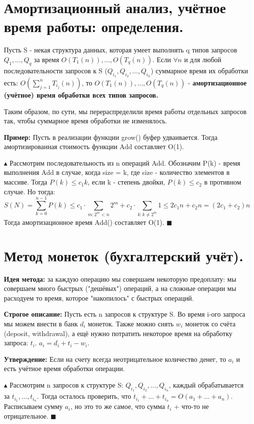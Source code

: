 \setcounter{section}{31}
\section{Амортизационный анализ, учётное время работы: определения.}
Пусть S - некая структура данных, которая умеет выполнять q типов запросов $Q_1, \dots, Q_q$ за время ${O}(T_1(n)), \dots, {O}(T_q(n))$. Если $\forall n$ и для любой последовательности запросов к S  ($Q_{i_1}, Q_{i_2}, \dots, Q_{i_n}$) суммарное время их обработки есть: ${O}(\sum_{j=1}^n T_{i_j}(n))$, то ${O}(T_1(n)), \dots, {O}(T_q(n))$ - \textbf{амортизационное (учётное) время обработки всех типов запросов.}

Таким образом, по сути, мы перераспределили время работы отдельных запросов так, чтобы суммарное время обработки не изменялось. \par
\textbf{Пример:} Пусть в реализации функции grow() буфер удваивается. Тогда амортизированная стоимость функции Add составляет O(1). \par
$\blacktriangle$
Рассмотрим последовательность из n операций Add. Обозначим P(k) - время выполнения Add в случае, когда size = k, где size - количество элементов в массиве. Тогда $P(k) \leqslant c_1k$, если k - степень двойки, $P(k) \leqslant c_2$ в противном случае. Но тогда:
\[
S(N) = \sum_{k=0}^{n-1}P(k) \leqslant c_1 \cdot \sum_{m: 2^m < n}2^m + c_2 \cdot \sum_{k: k \neq 2^m}1 \leqslant 2c_1n + c_2n = (2c_1 + c_2)n
\]
Тогда амортизационное время Add() составляет O(1).
$\blacksquare$

\setcounter{section}{32}
\section{Метод монеток (бухгалтерский учёт).}
\textbf{Идея метода:} за каждую операцию мы совершаем некоторую предоплату: мы совершаем много быстрых ("дешёвых") операций, а на сложные операции мы расходуем то время, которое "накопилось" с быстрых операций. \par
\textbf{Строгое описание:} Пусть есть n запросов к структуре S. Во время i-ого запроса мы можем внести в банк $d_i$ монеток. Также можно снять $w_i$ монеток со счёта (deposit, withdrawal), а ещё нужно потратить некоторое время на обработку запроса: $t_i$. $a_i = d_i + t_i - w_i$. \par
\textbf{Утверждение:} Если на счету всегда неотрицательное количество денег, то $a_i$ и есть учётное время обработки операции. \par
$\blacktriangle$
Рассмотрим n запросов к структуре S: $Q_{i_1}, Q_{i_2}, \dots, Q_{i_n}$, каждый обрабатывается за $t_{i_1}, \dots, t_{i_n}$. Тогда осталось проверить, что $t_{i_1} + \dots + t_{i_n} = {O}(a_1 + \dots + a_n)$. Расписываем сумму $a_i$, но это то же самое, что сумма $t_i$ + что-то не отрицательное. 
$\blacksquare$